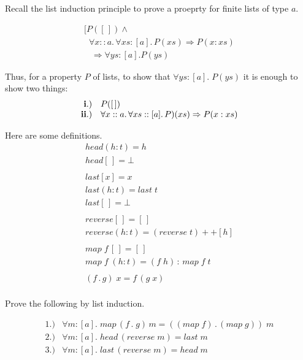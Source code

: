 \documentclass[11pt]{article}
\begin{document}

Recall the list induction principle to prove a proeprty for finite lists of type $a$.

\[\begin{array}{l}

[P([\,]) \wedge \\
\;\;\forall{}x::a.\,\forall xs:[a].\, P(xs) \Rightarrow P(x:xs) \\
\;\;\; \Rightarrow \forall{}ys:[a]. P(ys)
\end{array}\]

Thus, for a property $P$ of lists, to show that $\forall{}ys:[a].\; P(ys)$ it
is enough to show two things:
\[\begin{array}{rl}
{\bf{i.)}} & P([\,]) \\
{\bf{ii.)}} & \forall x::a.\,\forall{}xs::[a].\, P)(xs) \Rightarrow P(x:xs)\\
\end{array}\]

Here are some definitions.
\[\begin{array}{l}

head (h:t) = h \\
head [\,] = \bot \\
\ \\
last [x] = x \\
last (h:t) = last \; t \\
last [\,] = \bot \\
\ \\
reverse [\,] = [\,]\\
reverse (h:t) = (reverse \; t ) ++ [h] \\
\ \\
map\; f\, [\,] = [\,] \\
map \; f \; (h:t) = (f\; h)\, :\, map \; f \; t \\
\ \\
(f\, .\, g)\; x = f\, (g\; x)\\

\end{array}\]


Prove the following by list induction.

\[\begin{array}{ll}
1.) & \forall{}m \!:\![a].\; map \,(f\, .\; g)\, m = ((map\; f)\, .\, (map\; g))\; m\\
2.) & \forall{}m \!:\![a].\; head\, (reverse \; m) = last \; m \\
3.) & \forall{}m \!:\![a].\; last\, (reverse \; m) = head \; m
\end{array}
\]
\end{document}
